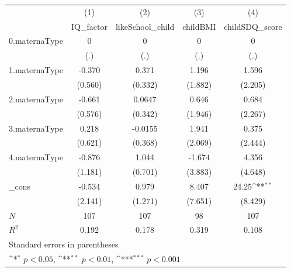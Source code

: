 {
\def\sym#1{\ifmmode^{#1}\else\(^{#1}\)\fi}
\begin{tabular}{l*{4}{c}}
\toprule
            &\multicolumn{1}{c}{(1)}&\multicolumn{1}{c}{(2)}&\multicolumn{1}{c}{(3)}&\multicolumn{1}{c}{(4)}\\
            &\multicolumn{1}{c}{IQ\_factor}&\multicolumn{1}{c}{likeSchool\_child}&\multicolumn{1}{c}{childBMI}&\multicolumn{1}{c}{childSDQ\_score}\\
\midrule
0.maternaType&           0         &           0         &           0         &           0         \\
            &         (.)         &         (.)         &         (.)         &         (.)         \\
\addlinespace
1.maternaType&      -0.370         &       0.371         &       1.196         &       1.596         \\
            &     (0.560)         &     (0.332)         &     (1.882)         &     (2.205)         \\
\addlinespace
2.maternaType&      -0.661         &      0.0647         &       0.646         &       0.684         \\
            &     (0.576)         &     (0.342)         &     (1.946)         &     (2.267)         \\
\addlinespace
3.maternaType&       0.218         &     -0.0155         &       1.941         &       0.375         \\
            &     (0.621)         &     (0.368)         &     (2.069)         &     (2.444)         \\
\addlinespace
4.maternaType&      -0.876         &       1.044         &      -1.674         &       4.356         \\
            &     (1.181)         &     (0.701)         &     (3.883)         &     (4.648)         \\
\addlinespace
\_cons      &      -0.534         &       0.979         &       8.407         &       24.25\sym{**} \\
            &     (2.141)         &     (1.271)         &     (7.651)         &     (8.429)         \\
\midrule
\(N\)       &         107         &         107         &          98         &         107         \\
\(R^{2}\)   &       0.192         &       0.178         &       0.319         &       0.108         \\
\bottomrule
\multicolumn{5}{l}{\footnotesize Standard errors in parentheses}\\
\multicolumn{5}{l}{\footnotesize \sym{*} \(p<0.05\), \sym{**} \(p<0.01\), \sym{***} \(p<0.001\)}\\
\end{tabular}
}
